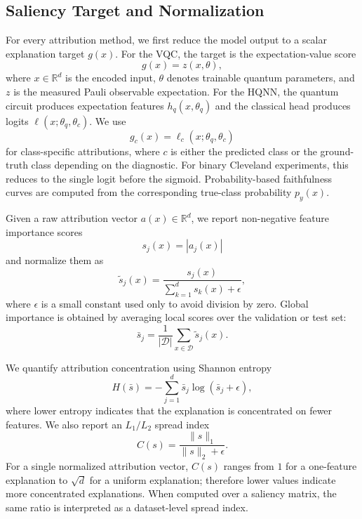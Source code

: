 
\subsection{Saliency Target and Normalization}
For every attribution method, we first reduce the model output to a scalar explanation target $g(x)$. For the VQC, the target is the expectation-value score
\begin{equation}
g(x)=z(x,\theta),
\end{equation}
where $x\in\mathbb{R}^{d}$ is the encoded input, $\theta$ denotes trainable quantum parameters, and $z$ is the measured Pauli observable expectation. For the HQNN, the quantum circuit produces expectation features $h_q(x,\theta_q)$ and the classical head produces logits $\ell(x;\theta_q,\theta_c)$. We use
\begin{equation}
g_c(x)=\ell_c(x;\theta_q,\theta_c)
\end{equation}
for class-specific attributions, where $c$ is either the predicted class or the ground-truth class depending on the diagnostic. For binary Cleveland experiments, this reduces to the single logit before the sigmoid. Probability-based faithfulness curves are computed from the corresponding true-class probability $p_y(x)$.

Given a raw attribution vector $a(x)\in\mathbb{R}^{d}$, we report non-negative feature importance scores
\begin{equation}
s_j(x)=|a_j(x)|
\end{equation}
and normalize them as
\begin{equation}
\tilde{s}_j(x)=
\frac{s_j(x)}
{\sum_{k=1}^{d}s_k(x)+\epsilon},
\end{equation}
where $\epsilon$ is a small constant used only to avoid division by zero. Global importance is obtained by averaging local scores over the validation or test set:
\begin{equation}
\bar{s}_j=\frac{1}{|\mathcal{D}|}\sum_{x\in\mathcal{D}}\tilde{s}_j(x).
\end{equation}

We quantify attribution concentration using Shannon entropy
\begin{equation}
H(\bar{s})=
-\sum_{j=1}^{d}\bar{s}_j\log(\bar{s}_j+\epsilon),
\end{equation}
where lower entropy indicates that the explanation is concentrated on fewer features. We also report an $L_1/L_2$ spread index
\begin{equation}
C(s)=
\frac{\|s\|_1}{\|s\|_2+\epsilon}.
\end{equation}
For a single normalized attribution vector, $C(s)$ ranges from $1$ for a one-feature explanation to $\sqrt{d}$ for a uniform explanation; therefore lower values indicate more concentrated explanations. When computed over a saliency matrix, the same ratio is interpreted as a dataset-level spread index.
